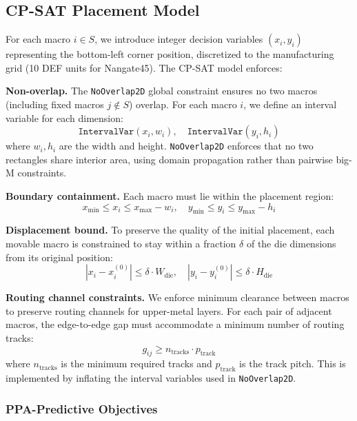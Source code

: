\documentclass[sigconf,anonymous,review,9pt]{acmart}
\begin{document}
\subsection{CP-SAT Placement Model}
\label{subsec:cpsat}

For each macro $i \in S$, we introduce integer decision variables $(x_i, y_i)$ representing the bottom-left corner position, discretized to the manufacturing grid (10 DEF units for Nangate45). The CP-SAT model enforces:

\textbf{Non-overlap.} The \texttt{NoOverlap2D} global constraint ensures no two macros (including fixed macros $j \notin S$) overlap. For each macro $i$, we define an interval variable for each dimension:
\begin{equation}
\texttt{IntervalVar}(x_i, w_i), \quad \texttt{IntervalVar}(y_i, h_i)
\end{equation}
where $w_i, h_i$ are the width and height. \texttt{NoOverlap2D} enforces that no two rectangles share interior area, using domain propagation rather than pairwise big-M constraints.

\textbf{Boundary containment.} Each macro must lie within the placement region:
\begin{equation}
x_{\min} \leq x_i \leq x_{\max} - w_i, \quad y_{\min} \leq y_i \leq y_{\max} - h_i
\end{equation}

\textbf{Displacement bound.} To preserve the quality of the initial placement, each movable macro is constrained to stay within a fraction $\delta$ of the die dimensions from its original position:
\begin{equation}
|x_i - x_i^{(0)}| \leq \delta \cdot W_{\text{die}}, \quad |y_i - y_i^{(0)}| \leq \delta \cdot H_{\text{die}}
\end{equation}

\textbf{Routing channel constraints.} We enforce minimum clearance between macros to preserve routing channels for upper-metal layers. For each pair of adjacent macros, the edge-to-edge gap must accommodate a minimum number of routing tracks:
\begin{equation}
g_{ij} \geq n_{\text{tracks}} \cdot p_{\text{track}}
\end{equation}
where $n_{\text{tracks}}$ is the minimum required tracks and $p_{\text{track}}$ is the track pitch. This is implemented by inflating the interval variables used in \texttt{NoOverlap2D}.

\subsubsection{PPA-Predictive Objectives}
\label{subsubsec:objectives}
\end{document}
